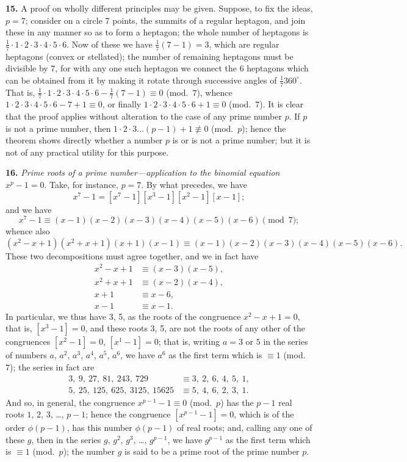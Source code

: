 \documentclass[11pt,a4paper]{article}
\begin{document}
\textbf{15.}\quad
A proof on wholly different principles may be given. Suppose, to fix the ideas, $p = 7$; consider on a circle 7 points, the summits of a regular heptagon, and join these in any manner so as to form a heptagon; the whole number of heptagons is $\frac{1}{7} \cdot 1 \cdot 2 \cdot 3 \cdot 4 \cdot 5 \cdot 6$. Now of these we have $\frac{1}{7}(7 - 1) = 3$, which are regular heptagons (convex or stellated); the number of remaining heptagons must be divisible by 7, for with any one such heptagon we connect the 6 heptagons which can be obtained from it by making it rotate through successive angles of $\frac{1}{7}360^{\circ}$. That is, $\frac{1}{7} \cdot 1 \cdot 2 \cdot 3 \cdot 4 \cdot 5 \cdot 6 - \frac{1}{7}(7 - 1) \equiv 0$ (mod.\ $7$), whence $1 \cdot 2 \cdot 3 \cdot 4 \cdot 5 \cdot 6 - 7 + 1 \equiv 0$, or finally $1 \cdot 2 \cdot 3 \cdot 4 \cdot 5 \cdot 6 + 1 \equiv 0$ (mod.\ $7$). It is clear that the proof applies without alteration to the case of any prime number $p$. If $p$ is not a prime number, then $1 \cdot 2 \cdot 3 \ldots (p - 1) + 1 \not\equiv 0$ (mod.\ $p$); hence the theorem shows directly whether a number $p$ is or is not a prime number; but it is not of any practical utility for this purpose.

\textbf{16.}\quad
\textit{Prime roots of a prime number---application to the binomial equation} $x^{p} - 1 = 0$. Take, for instance, $p = 7$. By what precedes, we have
\[
x^{7} - 1 = [x^{7} - 1][x^{3} - 1][x^{2} - 1][x - 1];
\]
and we have
\[
x^{7} - 1 \equiv (x - 1)(x - 2)(x - 3)(x - 4)(x - 5)(x - 6) \pmod{7};
\]
whence also
\[
(x^{2} - x + 1)(x^{2} + x + 1)(x + 1)(x - 1) \equiv (x - 1)(x - 2)(x - 3)(x - 4)(x - 5)(x - 6).
\]
These two decompositions must agree together, and we in fact have
\begin{align*}
x^{2} - x + 1 &\equiv (x - 3)(x - 5),\\
x^{2} + x + 1 &\equiv (x - 2)(x - 4),\\
x + 1 &\equiv x - 6,\\
x - 1 &\equiv x - 1.
\end{align*}
In particular, we thus have 3, 5, as the roots of the congruence $x^{2} - x + 1 = 0$, that is, $[x^{3} - 1] = 0$, and these roots 3, 5, are not the roots of any other of the congruences $[x^{2} - 1] = 0$, $[x^{1} - 1] = 0$; that is, writing $a = 3$ or $5$ in the series of numbers $a$, $a^{2}$, $a^{3}$, $a^{4}$, $a^{5}$, $a^{6}$, we have $a^{6}$ as the first term which is $\equiv 1$ (mod.\ $7$); the series in fact are
\begin{align*}
3,\ 9,\ 27,\ 81,\ 243,\ 729 &\equiv 3,\ 2,\ 6,\ 4,\ 5,\ 1,\\
5,\ 25,\ 125,\ 625,\ 3125,\ 15625 &\equiv 5,\ 4,\ 6,\ 2,\ 3,\ 1.
\end{align*}
And so, in general, the congruence $x^{p-1} - 1 \equiv 0$ (mod.\ $p$) has the $p - 1$ real roots $1$, $2$, $3$, \ldots, $p - 1$; hence the congruence $[x^{p-1} - 1] = 0$, which is of the order $\phi(p - 1)$, has this number $\phi(p - 1)$ of real roots; and, calling any one of these $g$, then in the series $g$, $g^{2}$, $g^{3}$, \ldots, $g^{p-1}$, we have $g^{p-1}$ as the first term which is $\equiv 1$ (mod.\ $p$); the number $g$ is said to be a prime root of the prime number $p$.
\end{document}
